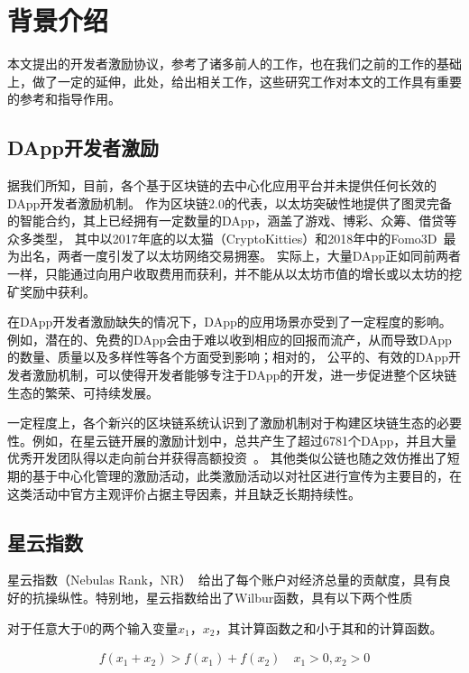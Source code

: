 \section{背景介绍}
本文提出的开发者激励协议，参考了诸多前人的工作，也在我们之前的工作的基础上，做了一定的延伸，此处，给出相关工作，这些研究工作对本文的工作具有重要的参考和指导作用。

\subsection{DApp开发者激励}
据我们所知，目前，各个基于区块链的去中心化应用平台并未提供任何长效的DApp开发者激励机制。
作为区块链2.0的代表，以太坊突破性地提供了图灵完备的智能合约，其上已经拥有一定数量的DApp，涵盖了游戏、博彩、众筹、借贷等众多类型，
其中以2017年底的以太猫（CryptoKitties）和2018年中的Fomo3D~\cite{Fomo3D}最为出名，两者一度引发了以太坊网络交易拥塞。
实际上，大量DApp正如同前两者一样，只能通过向用户收取费用而获利，并不能从以太坊市值的增长或以太坊的挖矿奖励中获利。

在DApp开发者激励缺失的情况下，DApp的应用场景亦受到了一定程度的影响。例如，潜在的、免费的DApp会由于难以收到相应的回报而流产，从而导致DApp的数量、质量以及多样性等各个方面受到影响；相对的，
公平的、有效的DApp开发者激励机制，可以使得开发者能够专注于DApp的开发，进一步促进整个区块链生态的繁荣、可持续发展。

一定程度上，各个新兴的区块链系统认识到了激励机制对于构建区块链生态的必要性。例如，在星云链开展的激励计划中，总共产生了超过6781个DApp，并且大量优秀开发团队得以走向前台并获得高额投资~\cite{Nebulasincentive}。
其他类似公链也随之效仿推出了短期的基于中心化管理的激励活动，此类激励活动以对社区进行宣传为主要目的，在这类活动中官方主观评价占据主导因素，并且缺乏长期持续性。

\subsection{星云指数}
星云指数（Nebulas Rank，NR）~\cite{Nebulasyellowpaper}给出了每个账户对经济总量的贡献度，具有良好的抗操纵性。特别地，星云指数给出了Wilbur函数，具有以下两个性质
\begin{property}
\label{prop:one}
对于任意大于$0$的两个输入变量$x_1$，$x_2$，其计算函数之和小于其和的计算函数。
\end{property}
\begin{align}
f(x_1+x_2)>f(x_1)+f(x_2) \quad x_1>0,x_2>0
\end{align}

